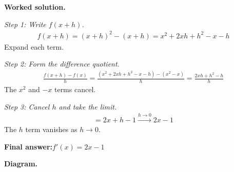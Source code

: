 \documentclass[11pt]{article}
\begin{document}
\textbf{Worked solution.}

\textit{Step 1: Write \( f(x+h) \).}
\[\begin{gathered}
f(x+h) = (x+h)^2 - (x+h) = x^2 + 2xh + h^2 - x - h
\end{gathered}\]
Expand each term.

\textit{Step 2: Form the difference quotient.}
\[\begin{gathered}
\frac{f(x+h) - f(x)}{h} = \frac{(x^2 + 2xh + h^2 - x - h) - (x^2 - x)}{h} = \frac{2xh + h^2 - h}{h}
\end{gathered}\]
The \( x^2 \) and \( -x \) terms cancel.

\textit{Step 3: Cancel \( h \) and take the limit.}
\[\begin{gathered}
= 2x + h - 1 \xrightarrow{h \to 0} 2x - 1
\end{gathered}\]
The \( h \) term vanishes as \( h \to 0 \).

\begin{answerbox}
\textbf{Final answer:}\quad \(\displaystyle  f'(x) = 2x - 1 \)
\end{answerbox}
\textbf{Diagram.}
\end{document}
